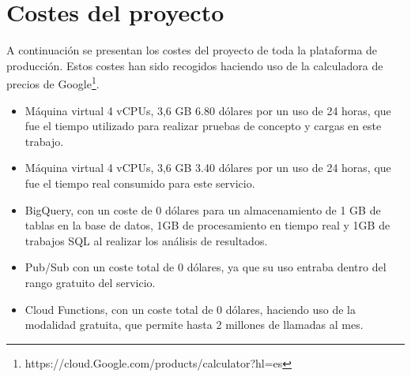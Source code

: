 \section{Costes del proyecto}\label{sec:costes-del-proyecto}
A continuación se presentan los costes del proyecto de toda la plataforma de producción.
Estos costes han sido recogidos haciendo uso de la calculadora de precios de Google\footnote{https://cloud.Google.com/products/calculator?hl=es}.

\begin{itemize}
    \item Máquina virtual 4 vCPUs, 3,6 GB 6.80 dólares por un uso de 24 horas, que fue el tiempo utilizado para realizar pruebas de concepto y cargas en este trabajo.
    \item Máquina virtual 4 vCPUs, 3,6 GB 3.40 dólares por un uso de 24 horas, que fue el tiempo real consumido para este servicio.
    \item BigQuery, con un coste de 0 dólares para un almacenamiento de 1 GB de tablas en la base de datos, 1GB de procesamiento en tiempo real y 1GB de trabajos SQL al realizar los análisis de resultados.
    \item Pub/Sub con un coste total de 0 dólares, ya que su uso entraba dentro del rango gratuito del servicio.
    \item Cloud Functions, con un coste total de 0 dólares, haciendo uso de la modalidad gratuita, que permite hasta 2 millones de llamadas al mes.
\end{itemize}
